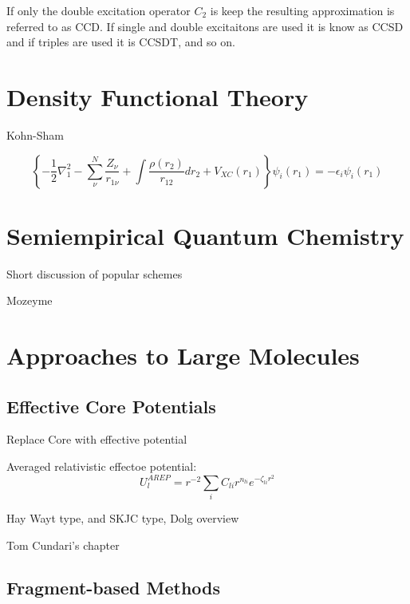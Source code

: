 If only the double excitation operator $C_2$ is keep the resulting approximation is referred to as CCD.  If single and double excitaitons are used it is know as CCSD and if triples are used it is CCSDT, and so on.


\section{Density Functional Theory}


Kohn-Sham\cite{KohnSham}

\begin{equation}
\left\{{-\frac{1}{2}\nabla_1^2}- \sum_\nu^N{\frac{Z_\nu}{r_{1\nu}}} + \int\frac{\rho(r_2)}{r_{12}}dr_2 + V_{XC}(r_1)\right\}\psi_i(r_1) = - \epsilon_i\psi_i(r_1)
\end{equation}




\section{Semiempirical Quantum Chemistry}
Short discussion of popular schemes

Mozeyme

\section{Approaches to Large Molecules}

\subsection{Effective Core Potentials}

Replace Core with effective potential


Averaged relativistic effectoe potential:
\begin{equation}
U_l^{AREP} = r^{-2}\sum_i{ C_{li}r^{n_{li}}e^{-\zeta_{li}r^2} }
\end{equation}

Hay Wayt type\cite{HayWadt1,HayWadt2,HayWadt3}, and SKJC type\cite{SBKpot1,SBKpot2,SBKpot3},  Dolg overview\cite{Dolg00}

Tom Cundari's chapter 

\subsection{Fragment-based Methods}

